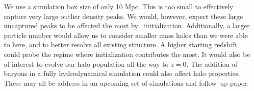 We use a simulation box size of only 10 Mpc.  This is too small to effectively capture very large outlier density peaks.  We would, however, expect these large uncaptured peaks to be affected the most by \lpt\ initialization.  Additionally, a larger particle number would allow us to consider smaller mass halos than we were able to here, and to better resolve all existing structure.  A higher starting redshift could probe the regime where \lpt initialization contributes the most.  It would also be of interest to evolve our halo population all the way to $z = 0$.  The addition of baryons in a fully hydrodynamical simulation could also affect halo properties.  These may all be address in an upcoming set of simulations and follow--up paper.
